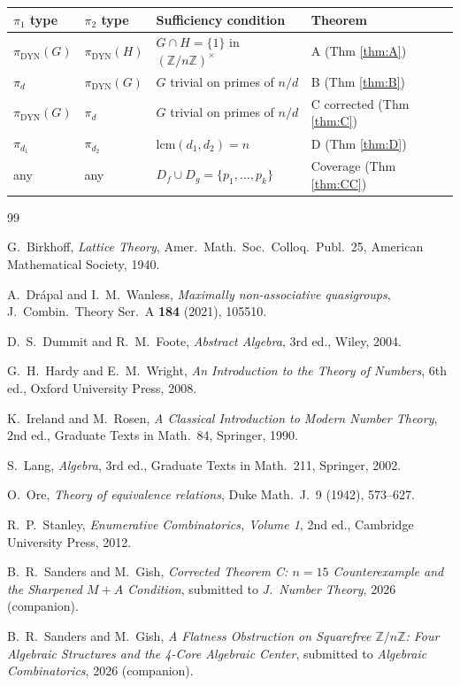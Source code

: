 \documentclass[11pt,reqno]{amsart}
\theoremstyle{plain}
\theoremstyle{definition}
\newcommand{\Z}{\mathbb{Z}}
\newcommand{\Zns}{(\Z/n\Z)^{\times}}
\newcommand{\DYN}{\mathrm{DYN}}
\newcommand{\lcm}{\mathrm{lcm}}
\begin{document}
\begin{center}
\begin{tabular}{|l|l|l|l|}
\hline
$\pi_1$ type & $\pi_2$ type & Sufficiency condition & Theorem \\
\hline
$\pi_{\DYN}(G)$ & $\pi_{\DYN}(H)$ & $G \cap H = \{1\}$ in $\Zns$ & A (Thm \ref{thm:A}) \\
$\pi_d$ & $\pi_{\DYN}(G)$ & $G$ trivial on primes of $n/d$ & B (Thm \ref{thm:B}) \\
$\pi_{\DYN}(G)$ & $\pi_d$ & $G$ trivial on primes of $n/d$ & C corrected (Thm \ref{thm:C}) \\
$\pi_{d_1}$ & $\pi_{d_2}$ & $\lcm(d_1, d_2) = n$ & D (Thm \ref{thm:D}) \\
any & any & $D_f \cup D_g = \{p_1, \ldots, p_k\}$ & Coverage (Thm \ref{thm:CC}) \\
\hline
\end{tabular}
\end{center}

\begin{thebibliography}{99}

G.~Birkhoff,
\emph{Lattice Theory},
Amer.\ Math.\ Soc.\ Colloq.\ Publ.\ 25,
American Mathematical Society, 1940.

A.~Dr\'apal and I.~M.~Wanless,
\emph{Maximally non-associative quasigroups},
J.\ Combin.\ Theory Ser.\ A \textbf{184} (2021), 105510.

D.~S.~Dummit and R.~M.~Foote,
\emph{Abstract Algebra}, 3rd ed.,
Wiley, 2004.

G.~H.~Hardy and E.~M.~Wright,
\emph{An Introduction to the Theory of Numbers}, 6th ed.,
Oxford University Press, 2008.

K.~Ireland and M.~Rosen,
\emph{A Classical Introduction to Modern Number Theory}, 2nd ed.,
Graduate Texts in Math.\ 84, Springer, 1990.

S.~Lang,
\emph{Algebra}, 3rd ed.,
Graduate Texts in Math.\ 211, Springer, 2002.

O.~Ore,
\emph{Theory of equivalence relations},
Duke Math.\ J.\ 9 (1942), 573--627.

R.~P.~Stanley,
\emph{Enumerative Combinatorics, Volume 1}, 2nd ed.,
Cambridge University Press, 2012.

B.~R.~Sanders and M.~Gish,
\emph{Corrected Theorem C: $n = 15$ Counterexample and the Sharpened
$M{+}A$ Condition},
submitted to \emph{J.\ Number Theory}, 2026 (companion).

B.~R.~Sanders and M.~Gish,
\emph{A Flatness Obstruction on Squarefree $\Z/n\Z$: Four Algebraic
Structures and the 4-Core Algebraic Center},
submitted to \emph{Algebraic Combinatorics}, 2026 (companion).

\end{thebibliography}
\end{document}
